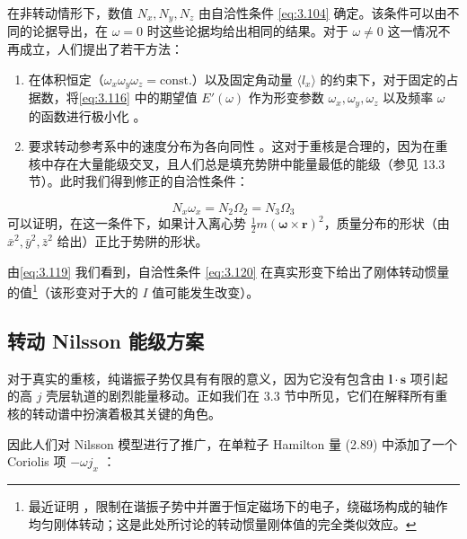 在非转动情形下，数值 $N_{x},N_{y},N_{z}$ 由自洽性条件 \ref{eq:3.104} 确定。该条件可以由不同的论据导出，在
$\omega=0$ 时这些论据均给出相同的结果。对于 $\omega\neq0$ 这一情况不再成立，人们提出了若干方法：
\begin{enumerate}
\item[(i)] 在体积恒定（$\omega_{x}\omega_{y}\omega_{z}=\text{const.}$）以及固定角动量 $\langle l_{x}\rangle$
的约束下，对于固定的占据数，将\ref{eq:3.116} 中的期望值 $E'(\omega)$ 作为形变参数 $\omega_{x},\omega_{y},\omega_{z}$
以及频率 $\omega$ 的函数进行极小化 \cite{St78,TA79}。
\item[(ii)] 要求转动参考系中的速度分布为各向同性 \cite{RBK75}。这对于重核是合理的，因为在重核中存在大量能级交叉，且人们总是填充势阱中能量最低的能级（参见
13.3 节）。此时我们得到修正的自洽性条件：
\end{enumerate}
\begin{equation}
N_{x}\omega_{x}=N_{2}\Omega_{2}=N_{3}\Omega_{3}\label{eq:3.120}
\end{equation}
可以证明，在这一条件下，如果计入离心势 $\frac{1}{2}m(\boldsymbol{\omega}\times\boldsymbol{r})^{2}$，质量分布的形状（由
$\bar{x}^{2},\bar{y}^{2},\bar{z}^{2}$ 给出）正比于势阱的形状。

由\ref{eq:3.119} 我们看到，自洽性条件 \ref{eq:3.120} 在真实形变下给出了刚体转动惯量的值\footnote{最近证明 \cite{FR76b}，限制在谐振子势中并置于恒定磁场下的电子，绕磁场构成的轴作均匀刚体转动；这是此处所讨论的转动惯量刚体值的完全类似效应。}（该形变对于大的
$I$ 值可能发生改变）。

\subsection{转动 Nilsson 能级方案}

对于真实的重核，纯谐振子势仅具有有限的意义，因为它没有包含由 $\boldsymbol{l}\cdot\boldsymbol{s}$
项引起的高 $j$ 壳层轨道的剧烈能量移动。正如我们在 3.3 节中所见，它们在解释所有重核的转动谱中扮演着极其关键的角色。

因此人们对 Nilsson 模型进行了推广，在单粒子 Hamilton 量 (2.89) 中添加了一个 Coriolis 项 $-\omega j_{x}$
\cite{ALL76,RNS78}：

